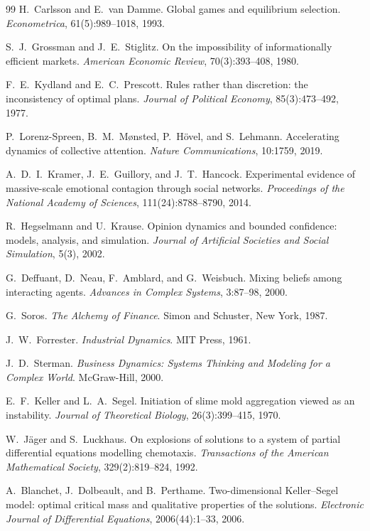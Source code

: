 \documentclass[11pt]{article}
\begin{document}
\begin{thebibliography}{99}
 H.~Carlsson and E.~van Damme. Global games and equilibrium selection. \emph{Econometrica}, 61(5):989--1018, 1993.

 S.~J.~Grossman and J.~E.~Stiglitz. On the impossibility of informationally efficient markets. \emph{American Economic Review}, 70(3):393--408, 1980.

 F.~E.~Kydland and E.~C.~Prescott. Rules rather than discretion: the inconsistency of optimal plans. \emph{Journal of Political Economy}, 85(3):473--492, 1977.

 P.~Lorenz-Spreen, B.~M.~M{\o}nsted, P.~H{\"o}vel, and S.~Lehmann. Accelerating dynamics of collective attention. \emph{Nature Communications}, 10:1759, 2019.

 A.~D.~I.~Kramer, J.~E.~Guillory, and J.~T.~Hancock. Experimental evidence of massive-scale emotional contagion through social networks. \emph{Proceedings of the National Academy of Sciences}, 111(24):8788--8790, 2014.

 R.~Hegselmann and U.~Krause. Opinion dynamics and bounded confidence: models, analysis, and simulation. \emph{Journal of Artificial Societies and Social Simulation}, 5(3), 2002.

 G.~Deffuant, D.~Neau, F.~Amblard, and G.~Weisbuch. Mixing beliefs among interacting agents. \emph{Advances in Complex Systems}, 3:87--98, 2000.

 G.~Soros. \emph{The Alchemy of Finance}. Simon and Schuster, New York, 1987.

 J.~W.~Forrester. \emph{Industrial Dynamics}. MIT Press, 1961.

 J.~D.~Sterman. \emph{Business Dynamics: Systems Thinking and Modeling for a Complex World}. McGraw-Hill, 2000.

 E.~F.~Keller and L.~A.~Segel. Initiation of slime mold aggregation viewed as an instability. \emph{Journal of Theoretical Biology}, 26(3):399--415, 1970.

 W.~J{\"a}ger and S.~Luckhaus. On explosions of solutions to a system of partial differential equations modelling chemotaxis. \emph{Transactions of the American Mathematical Society}, 329(2):819--824, 1992.

 A.~Blanchet, J.~Dolbeault, and B.~Perthame. Two-dimensional Keller--Segel model: optimal critical mass and qualitative properties of the solutions. \emph{Electronic Journal of Differential Equations}, 2006(44):1--33, 2006.


\end{thebibliography}
\end{document}
